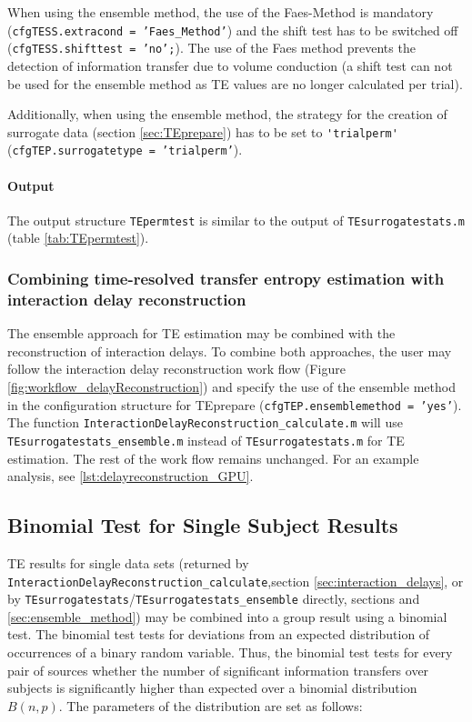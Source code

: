 \documentclass[a4paper,10pt]{article}
\begin{document}
When using the ensemble method, the use of the Faes-Method is mandatory (\texttt{cfgTESS.extracond = 'Faes\_Method'}) and the shift test has to be switched off (\texttt{cfgTESS.shifttest = 'no';}). The use of the Faes method prevents the detection of information transfer due to volume conduction (a shift test can not be used for the ensemble method as TE values are no longer calculated per trial).
 
Additionally, when using the ensemble method, the strategy for the creation of surrogate data (section \ref{sec:TEprepare}) has to be set to \verb+'trialperm'+ (\texttt{cfgTEP.surrogatetype = 'trialperm'}).

\paragraph*{Output} The output structure \texttt{TEpermtest} is similar to the output of \verb&TEsurrogatestats.m& (table \ref{tab:TEpermtest}).

\subsubsection{Combining time-resolved transfer entropy estimation with interaction delay reconstruction} 

The ensemble approach for TE estimation may be combined with the reconstruction of interaction delays. To combine both approaches, the user may follow the interaction delay reconstruction work flow (Figure \ref{fig:workflow_delayReconstruction}) and specify the use of the ensemble method in the configuration structure for TEprepare (\texttt{cfgTEP.ensemblemethod = 'yes'}). The function \texttt{InteractionDelayReconstruction\_calculate.m} will use \texttt{TEsurrogatestats\_ensemble.m} instead of \texttt{TEsurrogatestats.m} for TE estimation. The rest of the work flow remains unchanged. For an example analysis, see \ref{lst:delayreconstruction_GPU}.



\subsection{Binomial Test for Single Subject Results} \label{sec:binomstats}

TE results for single data sets (returned by \texttt{InteractionDelayReconstruction\_calculate},section \ref{sec:interaction_delays}, or by \texttt{TEsurrogatestats}/\texttt{TEsurrogatestats\_ensemble} directly, sections \label{sec:TEsurrogatestats} and \ref{sec:ensemble_method}) may be combined into a group result using a binomial test. The binomial test tests for deviations from an expected distribution of occurrences of a binary random variable. Thus, the binomial test tests for every pair of sources whether the number of significant information transfers over subjects is significantly higher than expected over a binomial distribution $B(n,p)$. The parameters of the distribution are set as follows:
\end{document}
